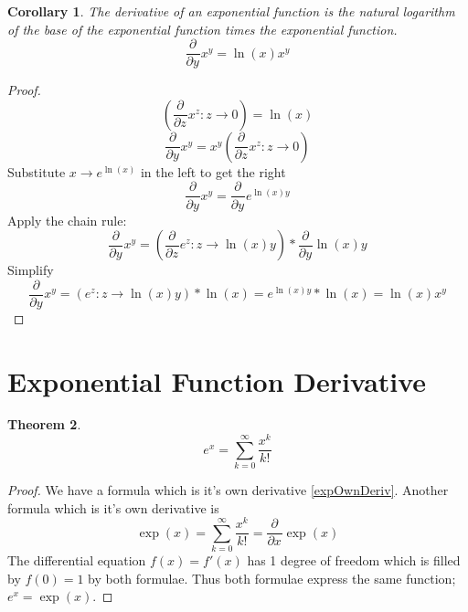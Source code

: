 \documentclass[]{article}
\newcommand{\pqty}[1]{{\left(#1\right)}}
\newcommand{\pdiff}[2]{\frac{\partial^{#2}}{\partial #1^{#2}}}
\newtheorem{theorem}{Theorem}[section]
\newtheorem{corollary}[theorem]{Corollary}
\numberwithin{equation}{section}
\begin{document}
	\begin{corollary}
		The derivative of an exponential function is the natural logarithm of the base of the exponential function times the exponential function.
		\begin{equation}
			\pdiff{y}{}x^y
			={\ln\pqty{x}}x^y
		\end{equation}
	\end{corollary}
	\begin{proof}
		\begin{equation}
		\pqty{\pdiff{z}{}x^z:z\to 0}=\ln\pqty{x}
		\end{equation}
		\begin{equation}
		\pdiff{y}{}x^y=x^y\pqty{\pdiff{z}{}x^z:z\to 0}
		\end{equation}
		Substitute \(x\to e^{\ln\pqty{x}}\) in the left to get the right
		\begin{equation}
		\pdiff{y}{}x^y=\pdiff{y}{}e^{\ln\pqty{x}y}
		\end{equation}
		Apply the chain rule:
		\begin{equation}
		\pdiff{y}{}x^y
		=\pqty{\pdiff{z}{}e^{z}:z\to \ln\pqty{x}y}*\pdiff{y}{}{\ln\pqty{x}y}
		\end{equation}
		Simplify
		\begin{equation}
		\pdiff{y}{}x^y
		=\pqty{e^{z}:z\to \ln\pqty{x}y}*{\ln\pqty{x}}
		=e^{\ln\pqty{x}y}*{\ln\pqty{x}}
		={\ln\pqty{x}}x^y
		\end{equation}
		
	\end{proof}

	\section{Exponential Function Derivative}
	\begin{theorem}
		\begin{equation}
			e^x=\sum_{k=0}^{\infty}\frac{x^k}{k!}
		\end{equation}
	\end{theorem}
	\begin{proof}
		We have a formula which is it's own derivative \eqref{expOwnDeriv}.
		Another formula which is it's own derivative is
		\begin{equation}
			\exp\pqty{x}
			=\sum_{k=0}^{\infty}\frac{x^k}{k!}
			=\pdiff{x}{}\exp\pqty{x}
		\end{equation}
		The differential equation \(f(x)=f'(x)\) has 1 degree of freedom which is filled by \(f(0)=1\) by both formulae. Thus both formulae express the same function; \(e^x=\exp(x)\).
	\end{proof}
\end{document}
